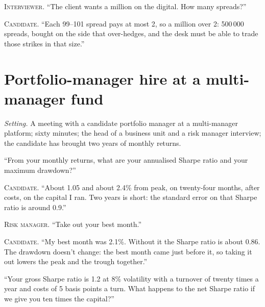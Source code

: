 \noindent\textsc{Interviewer.} ``The client wants a million on the digital. How many spreads?''

\noindent\textsc{Candidate.} ``Each 99--101 spread pays at most 2, so a million over 2: 500\,000 spreads, bought on the side that
over-hedges, and the desk must be able to trade those strikes in that size.''


\section{Portfolio-manager hire at a multi-manager fund}

\emph{Setting.} A meeting with a candidate portfolio manager at a multi-manager platform; sixty minutes; the head of a business
unit and a risk manager interview; the candidate has brought two years of monthly returns.

\begin{interviewq}\label{iq:iv:mock-interviews:16}
``From your monthly returns, what are your annualised Sharpe ratio and your maximum drawdown?''
\end{interviewq}

\noindent\textsc{Candidate.} ``About 1.05 and about 2.4\% from peak, on twenty-four months, after costs, on the capital I ran. Two
years is short: the standard error on that Sharpe ratio is around 0.9.''


\noindent\textsc{Risk manager.} ``Take out your best month.''

\noindent\textsc{Candidate.} ``My best month was 2.1\%. Without it the Sharpe ratio is about 0.86. The drawdown doesn't change: the best month
came just before it, so taking it out lowers the peak and the trough together.''


\begin{interviewq}\label{iq:iv:mock-interviews:17}
``Your gross Sharpe ratio is 1.2 at 8\% volatility with a turnover of twenty times a year and costs of 5 basis points a turn. What
happens to the net Sharpe ratio if we give you ten times the capital?''
\end{interviewq}

